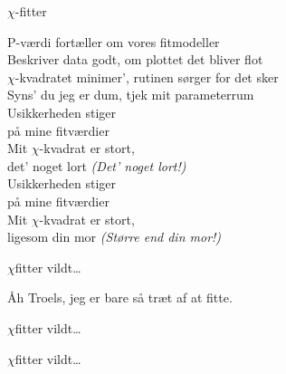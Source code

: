 \begin{song}{$\chi$-fitter}
  \begin{SBVerse}
    P-værdi fortæller om vores fitmodeller\\
    Beskriver data godt, om plottet det bliver flot\\
    $\chi$-kvadratet minimer', rutinen sørger for det sker\\
    Syns' du jeg er dum, tjek mit parameterrum\\\medskip
    Usikkerheden stiger\\
    på mine fitværdier\\
    Mit $\chi$-kvadrat er stort,\\
    det' noget lort \emph{(Det' noget lort!)}\\\medskip
    Usikkerheden stiger\\
    på mine fitværdier\\
    Mit $\chi$-kvadrat er stort,\\
    ligesom din mor \emph{(Større end din mor!)}
  \end{SBVerse}

  \begin{SBChorus}
    $\chi$fitter vildt\ldots
  \end{SBChorus}

  \begin{SBSection*}
    Åh Troels, jeg er bare så træt af at fitte.
  \end{SBSection*}

  \begin{SBChorus}
    $\chi$fitter vildt\ldots
  \end{SBChorus}

  \begin{SBChorus}
    $\chi$fitter vildt\ldots
  \end{SBChorus}
\end{song}